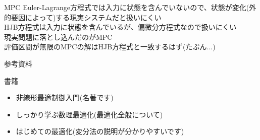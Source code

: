 \documentclass[twocolumn, dvipdfmx,12pt]{beamer}
\begin{document}
    \begin{frame}{MPC}
        Euler-Lagrange方程式では入力に状態を含んでいないので、状態が変化(外的要因によって)する現実システムだと扱いにくい \\
        HJB方程式は入力に状態を含んでいるが、偏微分方程式なので扱いにくい \\
        現実問題に落とし込んだのがMPC \\
        評価区間が無限のMPCの解はHJB方程式と一致するはず(たぶん...) \\
    \end{frame}

    \begin{frame}{参考資料}
        \footnotesize

        書籍\\
        \begin{itemize}
            \item 非線形最適制御入門(名著です)
            \item しっかり学ぶ数理最適化(最適化全般について)
            \item はじめての最適化(変分法の説明が分かりやすいです)
        \end{itemize}
    \end{frame}
    
\end{document}
